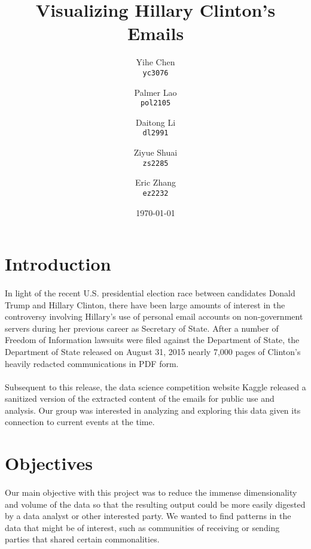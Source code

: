 \documentclass[11pt]{article}
\begin{document}
\title{Visualizing Hillary Clinton's Emails}

\author{
  Yihe Chen \\
  \texttt{yc3076}
  \and 
  Palmer Lao \\
  \texttt{pol2105}
  \and
  Daitong Li \\
  \texttt{dl2991}
  \and
  Ziyue Shuai \\
  \texttt{zs2285}
  \and
  Eric Zhang \\ 
  \texttt{ez2232}
}

\date{\today}
\maketitle
\doublespacing


\section{Introduction}
\paragraph{} In light of the recent U.S. presidential election race between candidates Donald Trump and Hillary Clinton, there have been large amounts of interest in the controversy involving Hillary's use of personal email accounts on non-government servers during her previous career as Secretary of State. After a number of Freedom of Information lawsuits were filed against the Department of State, the Department of State released on August 31, 2015 nearly 7,000 pages of Clinton's heavily redacted communications in PDF form.
\paragraph{} Subsequent to this release, the data science competition website Kaggle released a sanitized version of the extracted content of the emails for public use and analysis. Our group was interested in analyzing and exploring this data given its connection to current events at the time.

\section{Objectives}
\paragraph{} Our main objective with this project was to reduce the immense dimensionality and volume of the data so that the resulting output could be more easily digested by a data analyst or other interested party. We wanted to find patterns in the data that might be of interest, such as communities of receiving or sending parties that shared certain commonalities. 
\end{document}
